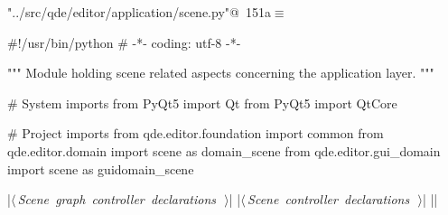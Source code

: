 \documentclass[%
    a4paper,    %
    justified,  %
    nobib,      %
    openany     %
]{tufte-book}
\begin{document}
\begin{flushleft} \small
\begin{minipage}{\linewidth}\label{scrap173}\raggedright\small
{} \verb@"../src/qde/editor/application/scene.py"@\nobreak\ {\footnotesize {151a}}$\equiv$
\vspace{-1ex}
\begin{pythoncode}
#!/usr/bin/python
# -*- coding: utf-8 -*-

""" Module holding scene related aspects concerning the application layer.
"""

# System imports
from PyQt5 import Qt
from PyQt5 import QtCore

# Project imports
from qde.editor.foundation import common
from qde.editor.domain     import scene as domain_scene
from qde.editor.gui_domain import scene as guidomain_scene

|\hbox{$\langle\,${\itshape Scene graph controller declarations}\nobreak\ {\footnotesize {}}$\,\rangle$}|
|\hbox{$\langle\,${\itshape Scene controller declarations}\nobreak\ {\footnotesize {}}$\,\rangle$}|
|\NWsep|
\end{pythoncode}
\vspace{1.5ex}
\footnotesize
\begin{list}{}{\setlength{\itemsep}{-\parsep}\setlength{\itemindent}{-\leftmargin}}

\item{}
\end{list}
\end{minipage}\vspace{4ex}
\end{flushleft}
\end{document}
